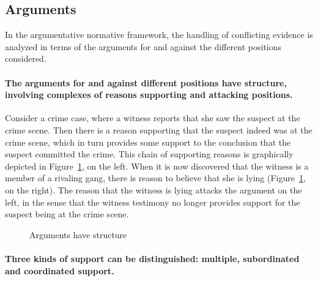 \documentclass[10pt]{article}
\begin{document}


\subsection{Arguments}
\label{sec:confArg}


In the argumentative normative framework, the handling of conflicting evidence is analyzed in terms of the arguments for and against the different positions considered.

\paragraph{The arguments for and against different positions have structure, involving complexes of reasons supporting and attacking positions.} 

Consider a crime case, where a witness reports that she saw the suspect at the crime scene. Then there is a reason supporting that the suspect indeed was at the crime scene, which in turn provides some support to the conclusion that the suspect committed the crime. This chain of supporting reasons is graphically depicted in Figure~\ref{fig:arg2}, on the left. 
When it is now discovered that the witness is a member of a rivaling gang, there is reason to believe that she is lying (Figure~\ref{fig:arg2}, on the right). The reason that the witness is lying attacks the argument on the left, in the sense that the witness testimony no longer provides support for the suspect being at the crime scene.

\begin{figure}[bt]
\centering

\caption{Arguments have structure\label{fig:arg2}}
\end{figure}

\paragraph{Three kinds of support can be distinguished: multiple, subordinated and coordinated support.}
\end{document}
